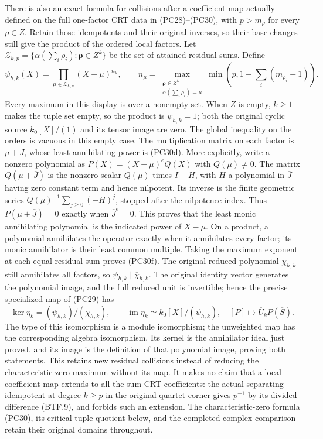There is also an exact formula for collisions after a
coefficient map actually defined on the full one-factor
CRT data in (PC28)--(PC30), with \(p>m_\rho\) for every
\(\rho\in Z\).  Retain those idempotents and
their original inverses, so their base changes still give
the product of the ordered local factors.  Let
\(\mathcal Z_{k,p}=\{\alpha(\sum_i\rho_i):
                         \boldsymbol\rho\in Z^k\}\)
be the set of attained residual sums.  Define
\[
 \psi_{h,k}(X)=\prod_{\mu\in\mathcal Z_{k,p}}
       (X-\mu)^{n_\mu},\qquad
 n_\mu=\max_{\substack{\boldsymbol\rho\in Z^k\\
                         \alpha(\sum_i\rho_i)=\mu}}
           \min\left(p,1+\sum_i(m_{\rho_i}-1)\right).
\tag{PC30f}\label{eq:pc30f-update}
\]
Every maximum in this display is over a nonempty set.
When \(Z\) is empty, \(k\geq1\) makes the tuple set
empty, so the product is \(\psi_{h,k}=1\); both the
original cyclic source \(k_0[X]/(1)\) and its tensor
image are zero.  The global inequality on the orders
is vacuous in this empty case.
The multiplication matrix on each factor is
\(\mu+\overline J\), whose least annihilating power
is (PC30d).  More explicitly, write a nonzero polynomial
as \(P(X)=(X-\mu)^eQ(X)\) with \(Q(\mu)\ne0\).
The matrix \(Q(\mu+\overline J)\) is the nonzero scalar
\(Q(\mu)\) times \(I+H\), with \(H\) a polynomial
in \(\overline J\) having zero constant term and hence
nilpotent.  Its inverse is the finite geometric series
\(Q(\mu)^{-1}\sum_{j\geq0}(-H)^j\), stopped after
the nilpotence index.  Thus \(P(\mu+\overline J)=0\)
exactly when \(\overline J^e=0\).  This proves that
the least monic annihilating polynomial is the indicated
power of \(X-\mu\).  On a product, a polynomial annihilates the
operator exactly when it annihilates every factor;
its monic annihilator is their least common multiple.
Taking the maximum exponent at each equal residual sum
proves (PC30f).  The original reduced polynomial
\(\overline\chi_{h,k}\) still annihilates all factors,
so \(\psi_{h,k}\mid\overline\chi_{h,k}\).  The original
identity vector generates the polynomial image, and
the full reduced unit is invertible; hence the precise
specialized map of (PC29) has
\[
 \ker\overline\eta_k
       =(\psi_{h,k})/(\overline\chi_{h,k}),\qquad
 \operatorname{im}\overline\eta_k
       \simeq k_0[X]/(\psi_{h,k}),
 \quad [P]\longmapsto\overline U_kP(\overline S).
\tag{PC30g}\label{eq:pc30g-update}
\]
The type of this isomorphism is a module isomorphism;
the unweighted map has the corresponding algebra
isomorphism.  Its kernel is the annihilator ideal
just proved, and its image is the definition of that
polynomial image, proving both statements.  This
retains new residual collisions instead of reducing
the characteristic-zero maximum without its map.
It makes no claim that a local coefficient map extends
to all the sum-CRT coefficients: the actual separating
idempotent at degree \(k\geq p\) in the original
quartet corner gives \(p^{-1}\) by its divided
difference (BTF.9), and forbids such an extension.
The characteristic-zero formula (PC30), its critical
tuple quotient below, and the completed complex
comparison retain their original domains throughout.


